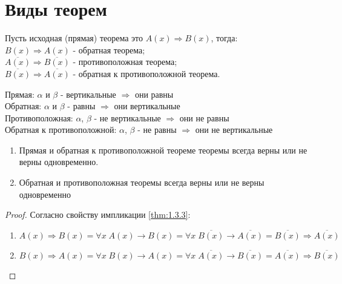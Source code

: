 \section{Виды теорем}

\begin{definition}
    Пусть исходная (прямая) теорема это $A(x) \Rightarrow B(x)$, тогда: \\
    $B(x) \Rightarrow A(x)$ - обратная теорема; \\
    $\overline{A(x)} \Rightarrow \overline{B(x)}$ - противоположная теорема; \\
    $\overline{B(x)} \Rightarrow \overline{A(x)}$ - обратная к противоположной теорема.
\end{definition}

\begin{example}
    \hfill

    Прямая: $\alpha$ и $\beta$ - вертикальные $\Rightarrow$ они равны \\
    Обратная: $\alpha$ и $\beta$ - равны $\Rightarrow$ они вертикальные \\
    Противоположная: $\alpha$, $\beta$ - не вертикальные $\Rightarrow$ они не равны \\ 
    Обратная к противоположной: $\alpha$, $\beta$ - не равны $\Rightarrow$ они не вертикальные
\end{example}

\begin{theorem}
    \hfill

    \begin{enumerate}
        \item Прямая и обратная к противоположной теореме теоремы всегда верны или не верны одновременно.
        \item Обратная и противоположная теоремы всегда верны или не верны одновременно
    \end{enumerate}
\end{theorem}

\begin{proof}
    Согласно свойству импликации \ref{thm:1.3.3}:

    \begin{enumerate}
        \item $A(x) \Rightarrow B(x) = \forall x \; A(x) \rightarrow B(x) = \forall x \; \overline{B(x)} \rightarrow \overline{A(x)} = \overline{B(x)} \Rightarrow \overline{A(x)}$
        \item $B(x) \Rightarrow A(x) = \forall x \; B(x) \rightarrow A(x) = \forall x \; \overline{A(x)} \rightarrow \overline{B(x)} = \overline{A(x)} \Rightarrow \overline{B(x)}$
    \end{enumerate}
\end{proof}